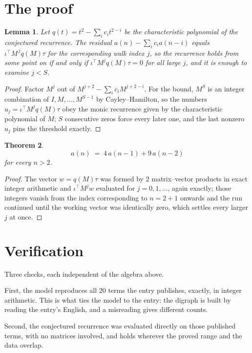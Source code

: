 \documentclass[11pt,a4paper]{article}
\theoremstyle{plain}
\newtheorem{theorem}{Theorem}
\newtheorem{lemma}[theorem]{Lemma}
\theoremstyle{definition}
\begin{document}
\section{The proof}

\begin{lemma}\label{lem:crit}
Let $q(t)=t^{2}-\sum_i c_it^{2-i}$ be the characteristic polynomial of the
conjectured recurrence. The residual $a(n)-\sum_ic_ia(n-i)$ equals
$\iota^{\!\top}M^{\,j}q(M)\tau$ for the corresponding walk index $j$, so the recurrence
holds from some point on if and only if $\iota^{\!\top}M^{j}q(M)\tau=0$ for all large $j$,
and it is enough to examine $j<S$.
\end{lemma}

\begin{proof}
Factor $M^{j}$ out of $M^{j+2}-\sum_ic_iM^{j+2-i}$. For the bound, $M^{S}$
is an integer combination of $I,M,\dots,M^{S-1}$ by Cayley--Hamilton, so the numbers
$u_j=\iota^{\!\top}M^{j}q(M)\tau$ obey the monic recurrence given by the characteristic
polynomial of $M$; $S$ consecutive zeros force every later one, and the last nonzero $u_j$
pins the threshold exactly.
\end{proof}

\begin{theorem}
\[
a(n)\;=\;4\,a(n-1) + 9\,a(n-2)
\]
for every $n>2$.
\end{theorem}

\begin{proof}
The vector $w=q(M)\tau$ was formed by $2$ matrix--vector products in exact integer
arithmetic and $\iota^{\!\top}M^{j}w$ evaluated for $j=0,1,\dots$, again exactly; those
integers vanish from the index corresponding to $n=2+1$ onwards and the run continued
until the working vector was identically zero, which settles every larger $j$ at once.
\end{proof}

\section{Verification}

Three checks, each independent of the algebra above.

First, the model reproduces all $20$ terms the entry publishes, exactly, in integer
arithmetic. This is what ties the model to the entry: the digraph is built by reading the
entry's English, and a misreading gives different counts.

Second, the conjectured recurrence was evaluated directly on those published terms, with no
matrices involved, and holds wherever the proved range and the data overlap.
\end{document}
